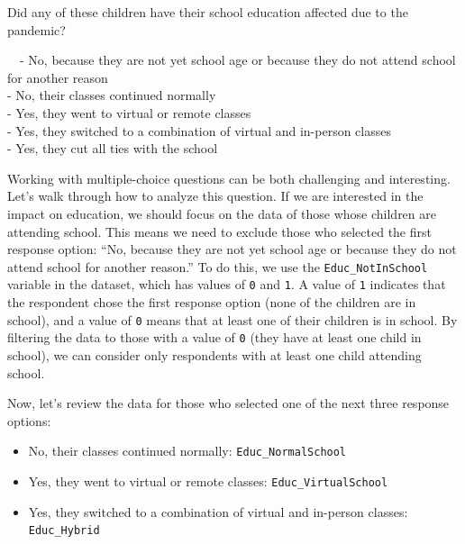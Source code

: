 \documentclass[
]{krantz}
\providecommand{\tightlist}{%
  \setlength{\itemsep}{0pt}\setlength{\parskip}{0pt}}
\renewenvironment{quote}{\begin{VF}}{\end{VF}}
\begin{document}
\begin{quote}
Did any of these children have their school education affected due to the pandemic?

~~- No, because they are not yet school age or because they do not attend school for another reason\\
\hspace*{0.333em}\hspace*{0.333em}- No, their classes continued normally\\
\hspace*{0.333em}\hspace*{0.333em}- Yes, they went to virtual or remote classes\\
\hspace*{0.333em}\hspace*{0.333em}- Yes, they switched to a combination of virtual and in-person classes\\
\hspace*{0.333em}\hspace*{0.333em}- Yes, they cut all ties with the school
\end{quote}

Working with multiple-choice questions can be both challenging and interesting. Let's walk through how to analyze this question. If we are interested in the impact on education, we should focus on the data of those whose children are attending school. This means we need to exclude those who selected the first response option: ``No, because they are not yet school age or because they do not attend school for another reason.'' To do this, we use the \texttt{Educ\_NotInSchool} variable in the dataset, which has values of \texttt{0} and \texttt{1}. A value of \texttt{1} indicates that the respondent chose the first response option (none of the children are in school), and a value of \texttt{0} means that at least one of their children is in school. By filtering the data to those with a value of \texttt{0} (they have at least one child in school), we can consider only respondents with at least one child attending school.

Now, let's review the data for those who selected one of the next three response options:

\begin{itemize}
\tightlist
\item
  No, their classes continued normally: \texttt{Educ\_NormalSchool}
\item
  Yes, they went to virtual or remote classes: \texttt{Educ\_VirtualSchool}
\item
  Yes, they switched to a combination of virtual and in-person classes: \texttt{Educ\_Hybrid}
\end{itemize}
\end{document}
